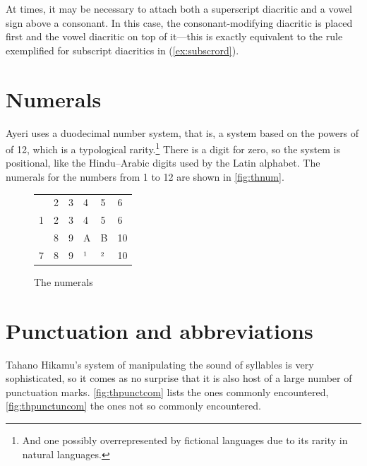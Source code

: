 At times, it may be necessary to attach both a superscript diacritic and a 
vowel sign above a consonant. In this case, the consonant-modifying diacritic 
is placed first and the vowel diacritic on top of it---this is exactly 
equivalent to the rule exemplified for subscript diacritics in 
(\ref{ex:subscrord}).


\section{Numerals}

Ayeri uses a duodecimal number system, that is, a system based on the powers of
of 12, which is a typological rarity.\footnote{And one possibly overrepresented 
by fictional languages due to its rarity in natural languages.} There is a 
digit for zero, so the system is positional, like the Hindu–Arabic digits used 
by the Latin alphabet. The numerals for the numbers from 1 to 12 are shown in 
\autoref{fig:thnum}.

\begin{figure}[ht]
\caption{The numerals}

\begin{tabu} to \linewidth{X[c] X[c] X[c] X[c] X[c] X[c]}
\toprule
{} & 2 & 3 & 4 & 5 & 6 \\
\rowfont{\Tagati\huge}	1 & 2 & 3 & 4 & 5 & 6 \\

\midrule

 & 8 & 9 & A & B & 10 \\
\rowfont{\Tagati\huge}	7 & 8 & 9 & ¹ & ² & 10 \\

\bottomrule
\end{tabu}
\label{fig:thnum}
\end{figure}



\section{Punctuation and abbreviations}

Tahano Hikamu's system of manipulating the sound of syllables is very 
sophisticated, so it comes as no surprise that it is also host of a large 
number of punctuation marks. \autoref{fig:thpunctcom} lists the ones commonly 
encountered, \autoref{fig:thpunctuncom} the ones not so commonly encountered.

